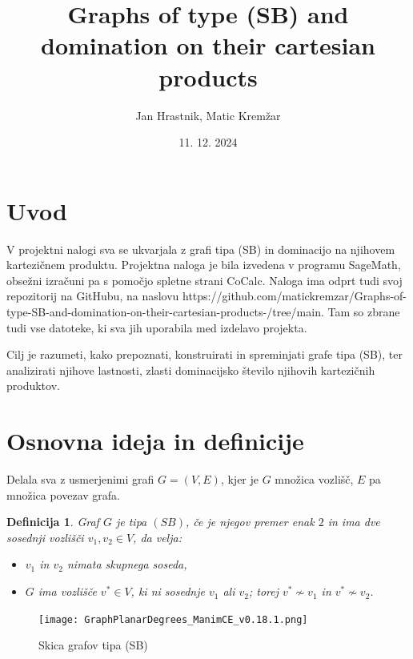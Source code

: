 \documentclass{article}
\begin{document}
\newtheorem{definition}{Definicija}


\title{Graphs of type (SB) and domination on their cartesian products}

\author{Jan Hrastnik, Matic Kremžar}
\date{11. 12. 2024}
\maketitle


\section{Uvod}
V projektni nalogi sva se ukvarjala z grafi tipa (SB) in dominacijo na njihovem kartezičnem produktu. 
Projektna naloga je bila izvedena v programu SageMath, obsežni izračuni pa s pomočjo spletne strani CoCalc.
Naloga ima odprt tudi svoj repozitorij na GitHubu, na naslovu https://github.com/matickremzar/Graphs-of-type-SB-and-domination-on-their-cartesian-products-/tree/main.
Tam so zbrane tudi vse datoteke, ki sva jih uporabila med izdelavo projekta.

Cilj je razumeti, kako prepoznati, konstruirati in spreminjati grafe tipa (SB), 
ter analizirati njihove lastnosti, zlasti dominacijsko število njihovih kartezičnih produktov.

\section{Osnovna ideja in definicije}
Delala sva z usmerjenimi grafi $G = (V,E)$, kjer je $G$ množica vozlišč, $E$ 
pa množica povezav grafa.

\begin{definition}
    Graf $G$ je tipa $(SB)$, če je njegov premer enak $2$ in ima dve sosednji vozlišči $v_1, v_2\in V$, da velja:
    \begin{itemize}
        \item $v_1$ in $v_2$ nimata skupnega soseda,
        \item $G$ ima vozlišče $v^*\in V$, ki ni sosednje $v_1$ ali $v_2$; torej $v^*\not\sim v_1$ in $v^*\not\sim v_2$. \newline
    \end{itemize}
\end{definition} 

\begin{figure}[h!]
    \centering
    \texttt{[image: GraphPlanarDegrees\_ManimCE\_v0.18.1.png]} %
    \caption{Skica grafov tipa (SB)}
    
\end{figure}
\end{document}
